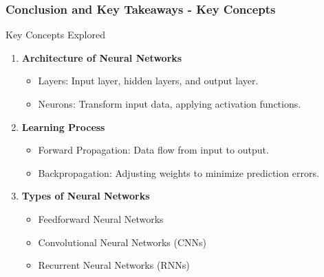 \documentclass[aspectratio=169]{beamer}
\begin{document}
\begin{frame}[fragile]
    \frametitle{Conclusion and Key Takeaways - Key Concepts}
    \begin{block}{Key Concepts Explored}
        \begin{enumerate}
            \item \textbf{Architecture of Neural Networks}
            \begin{itemize}
                \item Layers: Input layer, hidden layers, and output layer.
                \item Neurons: Transform input data, applying activation functions.
            \end{itemize}

            \item \textbf{Learning Process}
            \begin{itemize}
                \item Forward Propagation: Data flow from input to output.
                \item Backpropagation: Adjusting weights to minimize prediction errors.
            \end{itemize}
            
            \item \textbf{Types of Neural Networks}
            \begin{itemize}
                \item Feedforward Neural Networks
                \item Convolutional Neural Networks (CNNs)
                \item Recurrent Neural Networks (RNNs)
            \end{itemize}
        \end{enumerate}
    \end{block}
\end{frame}
\end{document}
